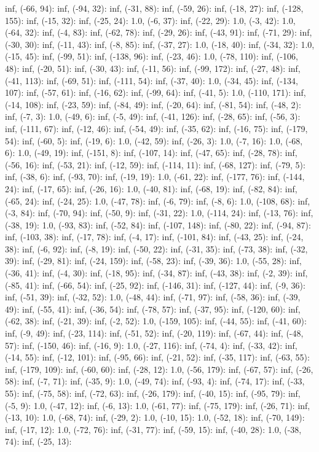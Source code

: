 \documentclass[parskip=half]{scrartcl}
\begin{document}
inf, (-66, 94): inf, (-94, 32): inf, (-31, 88): inf, (-59, 26): inf, (-18, 27): inf, (-128, 155): inf, (-15, 32): inf, (-25, 24): 1.0, (-6, 37): inf, (-22, 29): 1.0, (-3, 42): 1.0, (-64, 32): inf, (-4, 83): inf, (-62, 78): inf, (-29, 26): inf, (-43, 91): inf, (-71, 29): inf, (-30, 30): inf, (-11, 43): inf, (-8, 85): inf, (-37, 27): 1.0, (-18, 40): inf, (-34, 32): 1.0, (-15, 45): inf, (-99, 51): inf, (-138, 96): inf, (-23, 46): 1.0, (-78, 110): inf, (-106, 48): inf, (-20, 51): inf, (-30, 43): inf, (-11, 56): inf, (-99, 172): inf, (-27, 48): inf, (-41, 113): inf, (-69, 51): inf, (-111, 54): inf, (-37, 40): 1.0, (-34, 45): inf, (-134, 107): inf, (-57, 61): inf, (-16, 62): inf, (-99, 64): inf, (-41, 5): 1.0, (-110, 171): inf, (-14, 108): inf, (-23, 59): inf, (-84, 49): inf, (-20, 64): inf, (-81, 54): inf, (-48, 2): inf, (-7, 3): 1.0, (-49, 6): inf, (-5, 49): inf, (-41, 126): inf, (-28, 65): inf, (-56, 3): inf, (-111, 67): inf, (-12, 46): inf, (-54, 49): inf, (-35, 62): inf, (-16, 75): inf, (-179, 54): inf, (-60, 5): inf, (-19, 6): 1.0, (-42, 59): inf, (-26, 3): 1.0, (-7, 16): 1.0, (-68, 6): 1.0, (-49, 19): inf, (-151, 8): inf, (-107, 14): inf, (-47, 65): inf, (-28, 78): inf, (-56, 16): inf, (-53, 21): inf, (-12, 59): inf, (-114, 11): inf, (-68, 127): inf, (-79, 5): inf, (-38, 6): inf, (-93, 70): inf, (-19, 19): 1.0, (-61, 22): inf, (-177, 76): inf, (-144, 24): inf, (-17, 65): inf, (-26, 16): 1.0, (-40, 81): inf, (-68, 19): inf, (-82, 84): inf, (-65, 24): inf, (-24, 25): 1.0, (-47, 78): inf, (-6, 79): inf, (-8, 6): 1.0, (-108, 68): inf, (-3, 84): inf, (-70, 94): inf, (-50, 9): inf, (-31, 22): 1.0, (-114, 24): inf, (-13, 76): inf, (-38, 19): 1.0, (-93, 83): inf, (-52, 84): inf, (-107, 148): inf, (-80, 22): inf, (-94, 87): inf, (-103, 38): inf, (-17, 78): inf, (-4, 17): inf, (-101, 84): inf, (-43, 25): inf, (-24, 38): inf, (-6, 92): inf, (-8, 19): inf, (-50, 22): inf, (-31, 35): inf, (-73, 38): inf, (-32, 39): inf, (-29, 81): inf, (-24, 159): inf, (-58, 23): inf, (-39, 36): 1.0, (-55, 28): inf, (-36, 41): inf, (-4, 30): inf, (-18, 95): inf, (-34, 87): inf, (-43, 38): inf, (-2, 39): inf, (-85, 41): inf, (-66, 54): inf, (-25, 92): inf, (-146, 31): inf, (-127, 44): inf, (-9, 36): inf, (-51, 39): inf, (-32, 52): 1.0, (-48, 44): inf, (-71, 97): inf, (-58, 36): inf, (-39, 49): inf, (-55, 41): inf, (-36, 54): inf, (-78, 57): inf, (-37, 95): inf, (-120, 60): inf, (-62, 38): inf, (-21, 39): inf, (-2, 52): 1.0, (-159, 105): inf, (-44, 55): inf, (-41, 60): inf, (-9, 49): inf, (-23, 114): inf, (-51, 52): inf, (-20, 119): inf, (-67, 44): inf, (-48, 57): inf, (-150, 46): inf, (-16, 9): 1.0, (-27, 116): inf, (-74, 4): inf, (-33, 42): inf, (-14, 55): inf, (-12, 101): inf, (-95, 66): inf, (-21, 52): inf, (-35, 117): inf, (-63, 55): inf, (-179, 109): inf, (-60, 60): inf, (-28, 12): 1.0, (-56, 179): inf, (-67, 57): inf, (-26, 58): inf, (-7, 71): inf, (-35, 9): 1.0, (-49, 74): inf, (-93, 4): inf, (-74, 17): inf, (-33, 55): inf, (-75, 58): inf, (-72, 63): inf, (-26, 179): inf, (-40, 15): inf, (-95, 79): inf, (-5, 9): 1.0, (-47, 12): inf, (-6, 13): 1.0, (-61, 77): inf, (-75, 179): inf, (-26, 71): inf, (-13, 10): 1.0, (-68, 74): inf, (-29, 2): 1.0, (-10, 15): 1.0, (-52, 18): inf, (-70, 149): inf, (-17, 12): 1.0, (-72, 76): inf, (-31, 77): inf, (-59, 15): inf, (-40, 28): 1.0, (-38, 74): inf, (-25, 13): 
\end{document}
